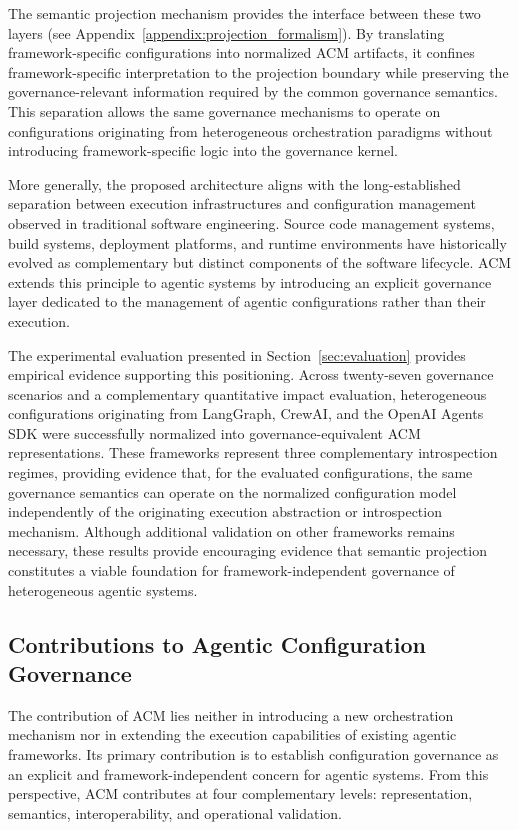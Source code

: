 \documentclass[10pt]{article}
\begin{document}
The semantic projection mechanism provides the interface between these two layers (see Appendix~\ref{appendix:projection_formalism}). By translating framework-specific configurations into normalized ACM artifacts, it confines framework-specific interpretation to the projection boundary while preserving the governance-relevant information required by the common governance semantics. This separation allows the same governance mechanisms to operate on configurations originating from heterogeneous orchestration paradigms without introducing framework-specific logic into the governance kernel.

More generally, the proposed architecture aligns with the long-established separation between execution infrastructures and configuration management observed in traditional software engineering. Source code management systems, build systems, deployment platforms, and runtime environments have historically evolved as complementary but distinct components of the software lifecycle. ACM extends this principle to agentic systems by introducing an explicit governance layer dedicated to the management of agentic configurations rather than their execution.

The experimental evaluation presented in Section~\ref{sec:evaluation} provides empirical evidence supporting this positioning. Across twenty-seven governance scenarios and a complementary quantitative impact evaluation, heterogeneous configurations originating from LangGraph, CrewAI, and the OpenAI Agents SDK were successfully normalized into governance-equivalent ACM representations. These frameworks represent three complementary introspection regimes, providing evidence that, for the evaluated configurations, the same governance semantics can operate on the normalized configuration model independently of the originating execution abstraction or introspection mechanism. Although additional validation on other frameworks remains necessary, these results provide encouraging evidence that semantic projection constitutes a viable foundation for framework-independent governance of heterogeneous agentic systems.

\subsection{Contributions to Agentic Configuration Governance}
\label{sec:governance_contributions}

The contribution of ACM lies neither in introducing a new orchestration mechanism nor in extending the execution capabilities of existing agentic frameworks. Its primary contribution is to establish configuration governance as an explicit and framework-independent concern for agentic systems. From this perspective, ACM contributes at four complementary levels: representation, semantics, interoperability, and operational validation.
\end{document}
